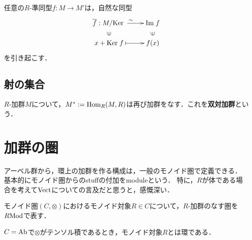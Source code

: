 \documentclass[uplatex,dvipdfmx]{jsreport}
\begin{document}
\begin{proposition}[準同型定理]
    任意の$R$-準同型$f:M\to M'$は，自然な同型
    \[\xymatrix@R-2pc{
        \o{f}:M/\Ker\ar[r]^\sim&\Im f\\
        \rotatebox[origin=c]{90}{$\in$}&\rotatebox[origin=c]{90}{$\in$}\\
        x+\Ker f\ar@{|->}[r]&f(x)
    }\]
    を引き起こす．
\end{proposition}

\subsection{射の集合}

\begin{definition}
    $R$-加群$M$について，$M^*:=\mathrm{Hom}_R(M,R)$は再び加群をなす．これを\textbf{双対加群}という．
\end{definition}

\section{加群の圏}

\begin{tcolorbox}[colframe=ForestGreen, colback=ForestGreen!10!white,breakable,colbacktitle=ForestGreen!40!white,coltitle=black,fonttitle=\bfseries\sffamily,
title=モノイド圏におけるモノイド対象上の加群]
    アーベル群から，環上の加群を作る構成は，一般のモノイド圏で定義できる．
    基本的にモノイド圏からのstuffの付加をmoduleという．
    特に，$R$が体である場合を考えて$\mathrm{Vect}$についての言及だと思うと，感慨深い．
\end{tcolorbox}

\begin{definition}
    モノイド圏$(C,\otimes)$におけるモノイド対象$R\in C$について，$R$-加群のなす圏を$R\mathrm{Mod}$で表す．
\end{definition}
\begin{example}
    $C=\mathrm{Ab}$で$\otimes$がテンソル積であるとき，モノイド対象$R$とは環である．
\end{example}
\end{document}
